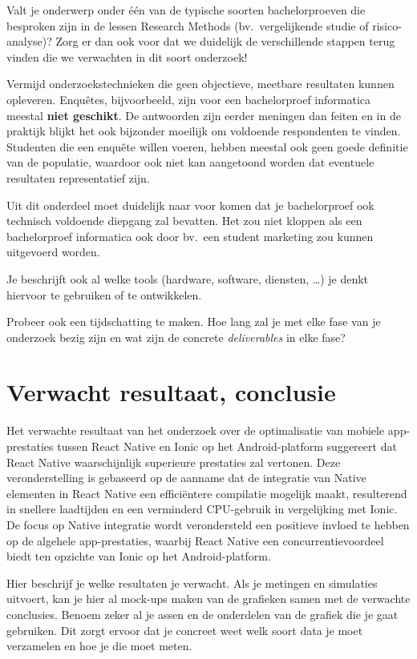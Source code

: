 Valt je onderwerp onder één van de typische soorten bachelorproeven die besproken zijn in de lessen Research Methods (bv.\ vergelijkende studie of risico-analyse)? Zorg er dan ook voor dat we duidelijk de verschillende stappen terug vinden die we verwachten in dit soort onderzoek!

Vermijd onderzoekstechnieken die geen objectieve, meetbare resultaten kunnen opleveren. Enquêtes, bijvoorbeeld, zijn voor een bachelorproef informatica meestal \textbf{niet geschikt}. De antwoorden zijn eerder meningen dan feiten en in de praktijk blijkt het ook bijzonder moeilijk om voldoende respondenten te vinden. Studenten die een enquête willen voeren, hebben meestal ook geen goede definitie van de populatie, waardoor ook niet kan aangetoond worden dat eventuele resultaten representatief zijn.

Uit dit onderdeel moet duidelijk naar voor komen dat je bachelorproef ook technisch voldoen\-de diepgang zal bevatten. Het zou niet kloppen als een bachelorproef informatica ook door bv.\ een student marketing zou kunnen uitgevoerd worden.

Je beschrijft ook al welke tools (hardware, software, diensten, \ldots) je denkt hiervoor te gebruiken of te ontwikkelen.

Probeer ook een tijdschatting te maken. Hoe lang zal je met elke fase van je onderzoek bezig zijn en wat zijn de concrete \emph{deliverables} in elke fase?

\section{Verwacht resultaat, conclusie}%
\label{sec:verwachte_resultaten}

Het verwachte resultaat van het onderzoek over de optimalisatie van mobiele app-prestaties tussen React Native en Ionic op het Android-platform suggereert dat React Native waarschijnlijk superieure prestaties zal vertonen. Deze veronderstelling is gebaseerd op de aanname dat de integratie van Native elementen in React Native een efficiëntere compilatie mogelijk maakt, resulterend in snellere laadtijden en een verminderd CPU-gebruik in vergelijking met Ionic. De focus op Native integratie wordt verondersteld een positieve invloed te hebben op de algehele app-prestaties, waarbij React Native een concurrentievoordeel biedt ten opzichte van Ionic op het Android-platform.

Hier beschrijf je welke resultaten je verwacht. Als je metingen en simulaties uitvoert, kan je hier al mock-ups maken van de grafieken samen met de verwachte conclusies. Benoem zeker al je assen en de onderdelen van de grafiek die je gaat gebruiken. Dit zorgt ervoor dat je concreet weet welk soort data je moet verzamelen en hoe je die moet meten.


